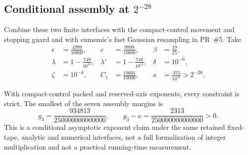 \subsection{Conditional assembly at $2^{-28}$}
Combine these two finite interfaces with the compact-control movement and
stopping guard and with eumemic's fast Gaussian resampling in PR~\#5.
Take
\[
\begin{aligned}
 \epsilon&=\frac{4999}{10000}, & c&=\frac{9999}{10000}, & \beta&=\frac{19}{25},\\
 \lambda&=1-\frac{749}{10^{11}}, &
 \lambda'&=1-\frac{748}{10^{11}}, & \delta&=10^{-6},\\
 \zeta&=10^{-4}, & C_1&=\frac{19601}{10000}, &
 \kappa&=\frac{373}{10^{11}}>2^{-28}.
\end{aligned}
\]

With compact-control packed and reserved-axis exponents, every constraint
is strict. The smallest of the seven assembly margins is
\[
 g_3=\frac{934813}{250000000000000},\qquad
 g_3-\kappa=\frac{2313}{250000000000000}>0.
\]
This is a conditional asymptotic exponent claim under the same retained
fixed-tape, analytic and numerical interfaces, not a full formalization of
integer multiplication and not a practical running-time measurement.
